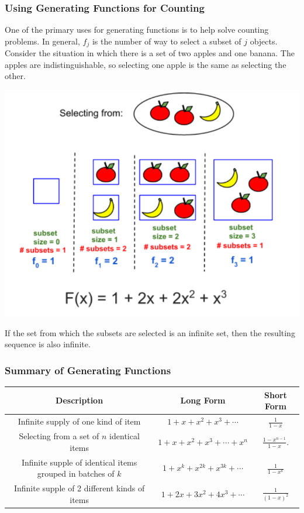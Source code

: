 \subsubsection*{Using Generating Functions for Counting}
One of the primary uses for generating functions is to help solve counting problems. In general, $f_j$ is the number of way to select a subset of $j$ objects. Consider the situation in which there is a set of two apples and one banana. The apples are indistinguishable, so selecting one apple is the same as selecting the other.

\begin{center}
  \includegraphics[width=.6\linewidth]{resources/11_two_apple_one_banana.png}
\end{center}

If the set from which the subsets are selected is an infinite set, then the resulting sequence is also infinite.

\subsubsection*{Summary of Generating Functions}
\begin{center}
  \begin{tabular}{|c|c|c|}
    \hline
    Description                                                  & Long Form                            & Short Form                               \\
    \hline
    Infinite supply of one kind of item                          & $1 + x + x^2 + x^3 + \cdots$         & ${\displaystyle \frac{1}{1-x}}$          \\
    \hline
    Selecting from a set of $n$ identical items                  & $1 + x + x^2 + x^3 + \cdots + x^n$   & ${\displaystyle \frac{1-x^{n-1}}{1-x}}$. \\
    \hline
    Infinite supple of identical items grouped in batches of $k$ & $1 + x^k + x^{2k} + x^{3k} + \cdots$ & ${\displaystyle \frac{1}{1-x^k}}$        \\
    \hline
    Infinite supple of 2 different kinds of items                & $1 + 2x + 3x^2 + 4x^3 + \cdots$      & ${\displaystyle \frac{1}{(1-x)^2}}$      \\
    \hline
  \end{tabular}
\end{center}

